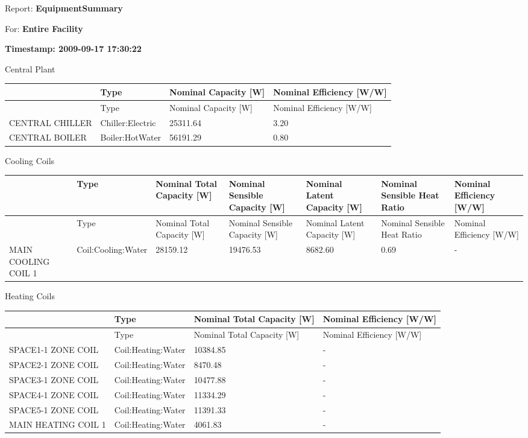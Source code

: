 Report: \textbf{EquipmentSummary}

For: \textbf{Entire Facility}

\textbf{Timestamp: 2009-09-17 17:30:22}

Central Plant

{\scriptsize
\begin{longtable}[c]{>{\raggedright}p{1.5in}>{\raggedright}p{1.5in}>{\raggedright}p{1.5in}>{\raggedright}p{1.5in}}
\toprule
~ & Type & Nominal Capacity [W] & Nominal Efficiency [W/W] \tabularnewline
\midrule
\endfirsthead

\toprule
~ & Type & Nominal Capacity [W] & Nominal Efficiency [W/W] \tabularnewline
\midrule
\endhead

CENTRAL CHILLER & Chiller:Electric & 25311.64 & 3.20 \tabularnewline
CENTRAL BOILER & Boiler:HotWater & 56191.29 & 0.80 \tabularnewline
\bottomrule
\end{longtable}}

Cooling Coils

{\scriptsize
\begin{longtable}[c]{>{\raggedright}p{0.85in}>{\raggedright}p{0.85in}>{\raggedright}p{0.85in}>{\raggedright}p{0.85in}>{\raggedright}p{0.85in}>{\raggedright}p{0.85in}>{\raggedright}p{0.85in}}
\toprule
~ & Type & Nominal Total Capacity [W] & Nominal Sensible Capacity [W] & Nominal Latent Capacity [W] & Nominal Sensible Heat Ratio & Nominal Efficiency [W/W] \tabularnewline
\midrule
\endfirsthead

\toprule
~ & Type & Nominal Total Capacity [W] & Nominal Sensible Capacity [W] & Nominal Latent Capacity [W] & Nominal Sensible Heat Ratio & Nominal Efficiency [W/W] \tabularnewline
\midrule
\endhead

MAIN COOLING COIL 1 & Coil:Cooling:Water & 28159.12 & 19476.53 & 8682.60 & 0.69 & - \tabularnewline
\bottomrule
\end{longtable}}

Heating Coils

\begin{longtable}[c]{>{\raggedright}p{1.5in}>{\raggedright}p{1.5in}>{\raggedright}p{1.5in}>{\raggedright}p{1.5in}}
\toprule
~ & Type & Nominal Total Capacity [W] & Nominal Efficiency [W/W] \tabularnewline
\midrule
\endfirsthead

\toprule
~ & Type & Nominal Total Capacity [W] & Nominal Efficiency [W/W] \tabularnewline
\midrule
\endhead

SPACE1-1 ZONE COIL & Coil:Heating:Water & 10384.85 & - \tabularnewline
SPACE2-1 ZONE COIL & Coil:Heating:Water & 8470.48 & - \tabularnewline
SPACE3-1 ZONE COIL & Coil:Heating:Water & 10477.88 & - \tabularnewline
SPACE4-1 ZONE COIL & Coil:Heating:Water & 11334.29 & - \tabularnewline
SPACE5-1 ZONE COIL & Coil:Heating:Water & 11391.33 & - \tabularnewline
MAIN HEATING COIL 1 & Coil:Heating:Water & 4061.83 & - \tabularnewline
\bottomrule
\end{longtable}

